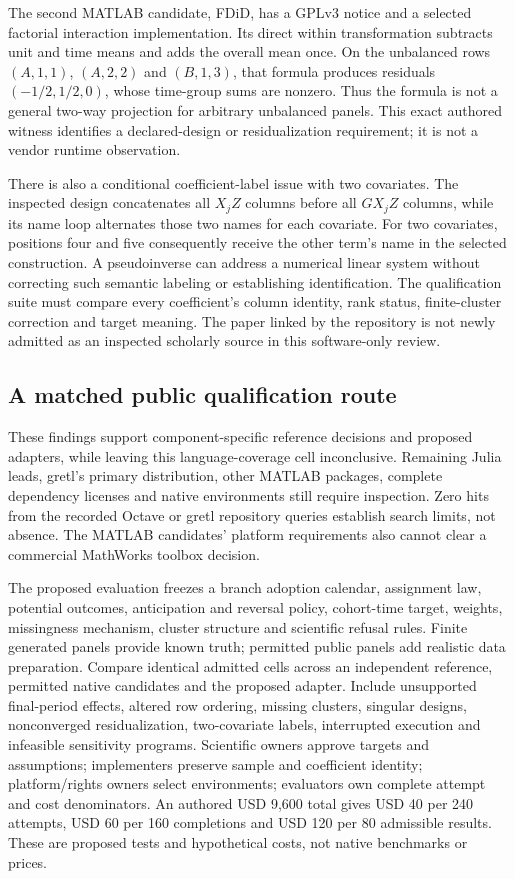The second MATLAB candidate, FDiD, has a GPLv3 notice and a selected factorial
interaction implementation. Its direct within transformation subtracts unit
and time means and adds the overall mean once. On the unbalanced rows
$(A,1,1)$, $(A,2,2)$ and $(B,1,3)$, that formula produces residuals
$(-1/2,1/2,0)$, whose time-group sums are nonzero. Thus the formula is not
a general two-way projection for arbitrary unbalanced panels. This exact
authored witness identifies a declared-design or residualization requirement;
it is not a vendor runtime observation.~\citep{exec25_panelother_matlab,exec25_panelother_choice}

There is also a conditional coefficient-label issue with two covariates.
The inspected design concatenates all $X_jZ$ columns before all $GX_jZ$
columns, while its name loop alternates those two names for each covariate.
For two covariates, positions four and five consequently receive the other
term's name in the selected construction. A pseudoinverse can address a
numerical linear system without correcting such semantic labeling or
establishing identification. The qualification suite must compare every
coefficient's column identity, rank status, finite-cluster correction and
target meaning. The paper linked by the repository is not newly admitted
as an inspected scholarly source in this software-only review.
\citep{exec25_panelother_matlab,exec25_panelother_choice}

\subsection{A matched public qualification route}
These findings support component-specific reference decisions and proposed
adapters, while leaving this language-coverage cell inconclusive. Remaining
Julia leads, gretl's primary distribution, other MATLAB packages, complete
dependency licenses and native environments still require inspection.
Zero hits from the recorded Octave or gretl repository queries establish
search limits, not absence. The MATLAB candidates' platform requirements
also cannot clear a commercial MathWorks toolbox decision.
\citep{exec25_panelother_choice}

The proposed evaluation freezes a branch adoption calendar, assignment law,
potential outcomes, anticipation and reversal policy, cohort-time target,
weights, missingness mechanism, cluster structure and scientific refusal
rules. Finite generated panels provide known truth; permitted public panels
add realistic data preparation. Compare identical admitted cells across
an independent reference, permitted native candidates and the proposed
adapter. Include unsupported final-period effects, altered row ordering,
missing clusters, singular designs, nonconverged residualization, two-covariate
labels, interrupted execution and infeasible sensitivity programs.
Scientific owners approve targets and assumptions; implementers preserve
sample and coefficient identity; platform/rights owners select environments;
evaluators own complete attempt and cost denominators. An authored USD 9,600
total gives USD 40 per 240 attempts, USD 60 per 160 completions and USD 120
per 80 admissible results. These are proposed tests and hypothetical costs,
not native benchmarks or prices.~\citep{exec25_panelother_choice}
